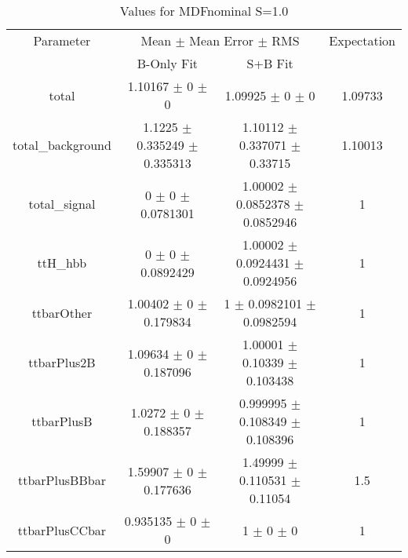 \begin{table}
\centering
\caption{Values for MDFnominal S=1.0}
\begin{tabular}{cccc}
\toprule
Parameter & \multicolumn{2}{c}{Mean $\pm$ Mean Error $\pm$ RMS} & Expectation\\
 & B-Only Fit & S+B Fit & \\
\midrule
total & \num{1.10167} $\pm$ \num{0} $\pm$ \num{0} & \num{1.09925} $\pm$ \num{0} $\pm$ \num{0} & \num{1.09733}\\
total\_background & \num{1.1225} $\pm$ \num{0.335249} $\pm$ \num{0.335313} & \num{1.10112} $\pm$ \num{0.337071} $\pm$ \num{0.33715} & \num{1.10013}\\
total\_signal & \num{0} $\pm$ \num{0} $\pm$ \num{0.0781301} & \num{1.00002} $\pm$ \num{0.0852378} $\pm$ \num{0.0852946} & \num{1}\\
ttH\_hbb & \num{0} $\pm$ \num{0} $\pm$ \num{0.0892429} & \num{1.00002} $\pm$ \num{0.0924431} $\pm$ \num{0.0924956} & \num{1}\\
ttbarOther & \num{1.00402} $\pm$ \num{0} $\pm$ \num{0.179834} & \num{1} $\pm$ \num{0.0982101} $\pm$ \num{0.0982594} & \num{1}\\
ttbarPlus2B & \num{1.09634} $\pm$ \num{0} $\pm$ \num{0.187096} & \num{1.00001} $\pm$ \num{0.10339} $\pm$ \num{0.103438} & \num{1}\\
ttbarPlusB & \num{1.0272} $\pm$ \num{0} $\pm$ \num{0.188357} & \num{0.999995} $\pm$ \num{0.108349} $\pm$ \num{0.108396} & \num{1}\\
ttbarPlusBBbar & \num{1.59907} $\pm$ \num{0} $\pm$ \num{0.177636} & \num{1.49999} $\pm$ \num{0.110531} $\pm$ \num{0.11054} & \num{1.5}\\
ttbarPlusCCbar & \num{0.935135} $\pm$ \num{0} $\pm$ \num{0} & \num{1} $\pm$ \num{0} $\pm$ \num{0} & \num{1}\\
\bottomrule
\end{tabular}
\end{table}
